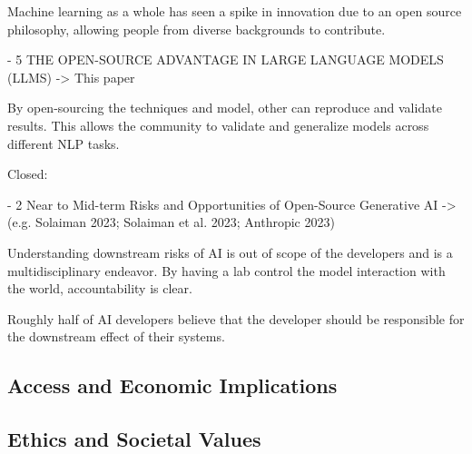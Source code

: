 Machine learning as a whole has seen a spike in innovation due to an open source philosophy, allowing people from diverse backgrounds to contribute.

- 5 THE OPEN-SOURCE ADVANTAGE IN LARGE LANGUAGE MODELS (LLMS) -> This paper
\citep{manchanda_open_2025}

By open-sourcing the techniques and model, other can reproduce and validate results. This allows the community to validate and generalize models across different NLP tasks.

Closed:

- 2 Near to Mid-term Risks and Opportunities of Open-Source Generative AI -> (e.g. Solaiman 2023; Solaiman et al. 2023; Anthropic 2023)
\citep{solaiman_gradient_2023}

Understanding downstream risks of AI is out of scope of the developers and is a multidisciplinary endeavor. By having a lab control the model interaction with the world, accountability is clear.

\citep{michael_what_2022}
Roughly half of AI developers believe that the developer should be responsible for the downstream effect of their systems.


\subsection{Access and Economic Implications}

\subsection{Ethics and Societal Values}
